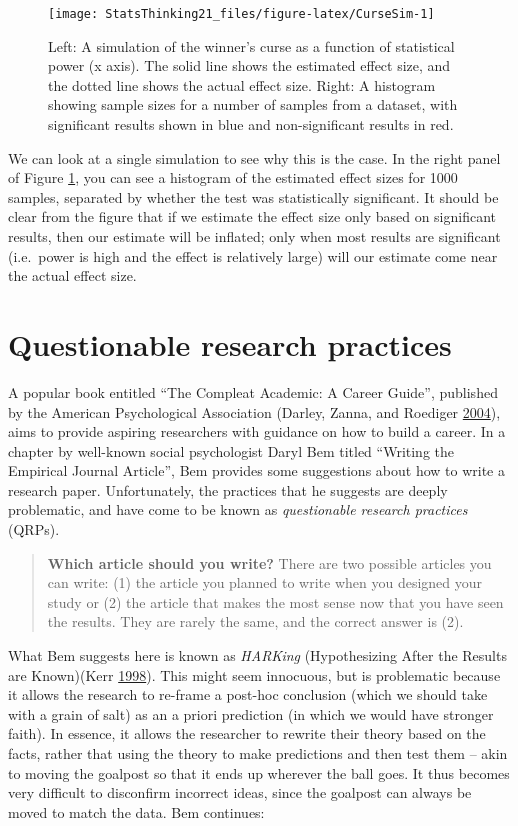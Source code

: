\documentclass[12pt,]{book}
\theoremstyle{definition}
\theoremstyle{definition}
\theoremstyle{definition}
\theoremstyle{remark}
\begin{document}
\begin{figure}
\texttt{[image: StatsThinking21\_files/figure-latex/CurseSim-1]} \caption{Left: A simulation of the winner's curse as a function of statistical power (x axis). The solid line shows the estimated effect size, and the dotted line shows the actual effect size. Right: A histogram showing sample sizes for a number of samples from a dataset, with significant results shown in blue and non-significant results in red. }\label{fig:CurseSim}
\end{figure}

We can look at a single simulation to see why this is the case. In the right panel of Figure \ref{fig:CurseSim}, you can see a histogram of the estimated effect sizes for 1000 samples, separated by whether the test was statistically significant. It should be clear from the figure that if we estimate the effect size only based on significant results, then our estimate will be inflated; only when most results are significant (i.e.~power is high and the effect is relatively large) will our estimate come near the actual effect size.

\hypertarget{questionable-research-practices}{%
\section{Questionable research practices}\label{questionable-research-practices}}

A popular book entitled ``The Compleat Academic: A Career Guide'', published by the American Psychological Association (Darley, Zanna, and Roediger \protect\hyperlink{ref-darl:zann:roed:2004}{2004}), aims to provide aspiring researchers with guidance on how to build a career. In a chapter by well-known social psychologist Daryl Bem titled ``Writing the Empirical Journal Article'', Bem provides some suggestions about how to write a research paper. Unfortunately, the practices that he suggests are deeply problematic, and have come to be known as \emph{questionable research practices} (QRPs).

\begin{quote}
\textbf{Which article should you write?} There are two possible articles you can write: (1) the article you planned to write when you designed your study or (2) the article that makes the most sense now that you have seen the results. They are rarely the same, and the correct answer is (2).
\end{quote}

What Bem suggests here is known as \emph{HARKing} (Hypothesizing After the Results are Known)(Kerr \protect\hyperlink{ref-kerr:1998}{1998}). This might seem innocuous, but is problematic because it allows the research to re-frame a post-hoc conclusion (which we should take with a grain of salt) as an a priori prediction (in which we would have stronger faith). In essence, it allows the researcher to rewrite their theory based on the facts, rather that using the theory to make predictions and then test them -- akin to moving the goalpost so that it ends up wherever the ball goes. It thus becomes very difficult to disconfirm incorrect ideas, since the goalpost can always be moved to match the data. Bem continues:
\end{document}
